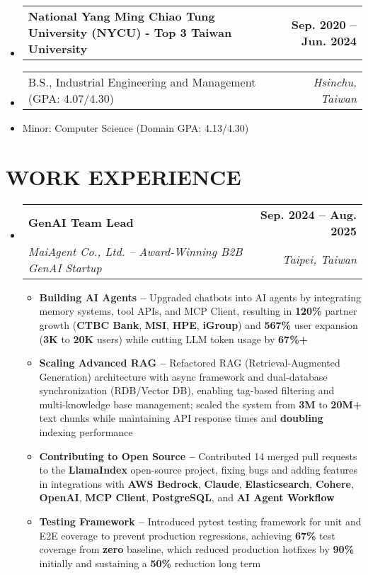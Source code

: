 \documentclass[letterpaper,11pt]{article}
\makeatletter
\newcommand{\resumeItem}[1]{
  \item\small{#1}
}
\newcommand{\resumeSubheadingnull}[2]{
  \item
    \begin{tabular*}{1.0\textwidth}[t]{l@{\extracolsep{\fill}}r}
      \textbf{#1} & \textbf{\small #2} \\
    \end{tabular*}\vspace{3pt}
}
\newcommand{\resumeSubheadinga}[4]{
  \vspace{-3pt}\item
    \begin{tabular*}{1.0\textwidth}[t]{l@{\extracolsep{\fill}}r}
      \textbf{#1} & \textbf{\small #2} \\
      \textit{\small#3} & \textit{\small #4} \\
    \end{tabular*}
}
\newcommand{\resumeSubItema}[2]{
  \item
    \begin{tabular*}{1.0\textwidth}[t]{l@{\extracolsep{\fill}}r}
      \small#1 & \textit{\small #2} \\
    \end{tabular*}
}
\newcommand{\resumeSubItem}[1]{\resumeItem{#1}}
\newcommand{\resumeSubHeadingListStart}{\begin{itemize}[leftmargin=0.0in, label={}]}
\newcommand{\resumeSubHeadingListEnd}{\end{itemize}}
\newcommand{\resumeItemListStart}{\begin{itemize}[label=$\vcenter{\hbox{\tiny$\bullet$}}$]}
\newcommand{\resumeItemListEnd}{\end{itemize}}
\makeatother
\begin{document}
\resumeSubHeadingListStart
\resumeSubheadingnull
{National Yang Ming Chiao Tung University (NYCU) - Top 3 Taiwan University }{Sep. 2020 -- Jun. 2024}
\vspace{-20pt}
\resumeSubItema{B.S., Industrial Engineering and Management (GPA: 4.07/4.30)}{Hsinchu, Taiwan}
\vspace{-15pt}
\resumeSubItem{Minor: Computer Science (Domain GPA: 4.13/4.30)}
\resumeSubHeadingListEnd


\vspace{-6pt}



\section{WORK EXPERIENCE}
\vspace{2pt}
\resumeSubHeadingListStart
\resumeSubheadinga
{GenAI Team Lead}{Sep. 2024 -- Aug. 2025}
{MaiAgent Co., Ltd. -- Award-Winning B2B GenAI Startup}{Taipei, Taiwan}
\vspace{-6pt}
\resumeItemListStart
\resumeItem{\textbf{Building AI Agents --} Upgraded chatbots into AI agents by integrating memory systems, tool APIs, and MCP Client, resulting in \textbf{120\%} partner growth (\textbf{CTBC Bank}, \textbf{MSI}, \textbf{HPE}, \textbf{iGroup}) and \textbf{567\%} user expansion (\textbf{3K} to \textbf{20K} users) while cutting LLM token usage by \textbf{67\%+}}
\resumeItem{\textbf{Scaling Advanced RAG --} Refactored RAG (Retrieval-Augmented Generation) architecture with async framework and dual-database synchronization (RDB/Vector DB), enabling tag-based filtering and multi-knowledge base management; scaled the system from \textbf{3M} to \textbf{20M+} text chunks while maintaining API response times and \textbf{doubling} indexing performance}
\resumeItem{\textbf{Contributing to Open Source --} Contributed 14 merged pull requests to the \textbf{LlamaIndex} open-source project, fixing bugs and adding features in integrations with \textbf{AWS Bedrock}, \textbf{Claude}, \textbf{Elasticsearch}, \textbf{Cohere}, \textbf{OpenAI}, \textbf{MCP Client}, \textbf{PostgreSQL}, and \textbf{AI Agent Workflow}}
\resumeItem{\textbf{Testing Framework --} Introduced pytest testing framework for unit and E2E coverage to prevent production regressions, achieving \textbf{67\%} test coverage from \textbf{zero} baseline, which reduced production hotfixes by \textbf{90\%} initially and sustaining a \textbf{50\%} reduction long term}
\resumeItemListEnd
\resumeSubHeadingListEnd
\end{document}
